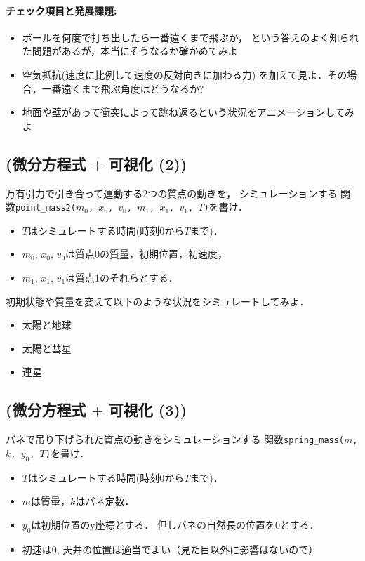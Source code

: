 \documentclass[10pt,dvipdfmx]{article}
\begin{document}
\paragraph{チェック項目と発展課題:}
\begin{itemize}
\item ボールを何度で打ち出したら一番遠くまで飛ぶか，
という答えのよく知られた問題があるが，本当にそうなるか確かめてみよ

\item 空気抵抗(速度に比例して速度の反対向きに加わる力)
を加えて見よ．その場合，一番遠くまで飛ぶ角度はどうなるか?

\item 地面や壁があって衝突によって跳ね返るという状況をアニメーションしてみよ
\end{itemize}

\subsection{{\scriptsize (微分方程式 $+$ 可視化 (2))}}
万有引力で引き合って運動する2つの質点の動きを，
シミュレーションする
関数{\tt point\_mass2($m_0$, $x_0$, $v_0$, $m_1$, $x_1$, $v_1$, $T$)}を書け．
\begin{itemize}
\item $T$はシミュレートする時間(時刻0から$T$まで)．
\item $m_0$, $x_0$, $v_0$は質点0の質量，初期位置，初速度，
\item $m_1$, $x_1$, $v_1$は質点1のそれらとする．
\end{itemize}

初期状態や質量を変えて以下のような状況をシミュレートしてみよ．
\begin{itemize}
\item 太陽と地球
\item 太陽と彗星
\item 連星
\end{itemize}

\subsection{{\scriptsize (微分方程式 $+$ 可視化 (3))}}
バネで吊り下げられた質点の動きをシミュレーションする
関数{\tt spring\_mass($m$, $k$, $y_0$, $T$)}を書け．
\begin{itemize}
\item $T$はシミュレートする時間(時刻0から$T$まで)．
\item $m$は質量，$k$はバネ定数．
\item $y_0$は初期位置のy座標とする．
但しバネの自然長の位置を0とする．
\item 初速は0, 天井の位置は適当でよい（見た目以外に影響はないので）
\end{itemize}
\end{document}

